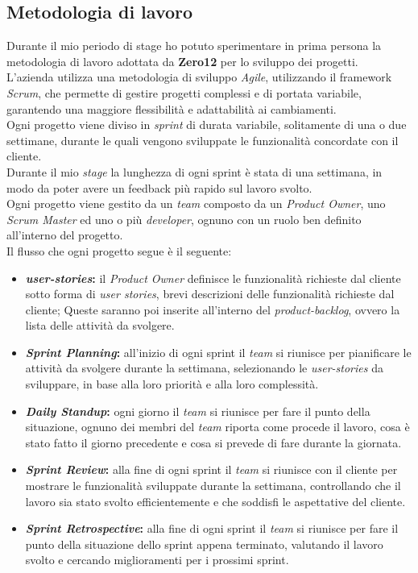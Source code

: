 \subsection{Metodologia di lavoro}
\label{sez:metodologia-lavoro}

Durante il mio periodo di stage ho potuto sperimentare in prima persona la metodologia di lavoro adottata da \textbf{Zero12} per lo sviluppo dei progetti.\\
L'azienda utilizza una metodologia di sviluppo \textit{Agile}, utilizzando il framework \textit{Scrum}, che permette di gestire progetti complessi e di portata variabile,
garantendo una maggiore flessibilità e adattabilità ai cambiamenti.\\
Ogni progetto viene diviso in \textit{sprint} di durata variabile, solitamente di una o due settimane, durante le quali vengono sviluppate le funzionalità concordate con il cliente.\\
Durante il mio \textit{stage} la lunghezza di ogni sprint è stata di una settimana, in modo da poter avere un feedback più rapido sul lavoro svolto.\\
Ogni progetto viene gestito da un \textit{team} composto da un \textit{Product Owner}, uno \textit{Scrum Master} ed uno o più \textit{developer}, ognuno con un ruolo ben definito all'interno del progetto.\\

Il flusso che ogni progetto segue è il seguente:
\begin{itemize}
    \item \textbf{\textit{\gls{user-stories}}:} il \textit{Product Owner} definisce le funzionalità richieste dal cliente sotto forma di \textit{user stories}, brevi descrizioni delle funzionalità richieste dal cliente;
    Queste saranno poi inserite all'interno del \textit{\gls{product-backlog}}, ovvero la lista delle attività da svolgere.
    \item \textbf{\textit{Sprint Planning}:} all'inizio di ogni sprint il \textit{team} si riunisce per pianificare le attività da svolgere durante la settimana, selezionando le \textit{\gls{user-stories}} da sviluppare, 
    in base alla loro priorità e alla loro complessità.
    \item \textbf{\textit{Daily Standup}:} ogni giorno il \textit{team} si riunisce per fare il punto della situazione, ognuno dei membri del \textit{team} riporta come procede il lavoro,
    cosa è stato fatto il giorno precedente e cosa si prevede di fare durante la giornata.
    \item \textbf{\textit{Sprint Review}:} alla fine di ogni sprint il \textit{team} si riunisce con il cliente per mostrare le funzionalità sviluppate durante la settimana, controllando che il lavoro sia stato svolto efficientemente e 
    che soddisfi le aspettative del cliente.
    \item \textbf{\textit{Sprint Retrospective}:} alla fine di ogni sprint il \textit{team} si riunisce per fare il punto della situazione dello sprint appena terminato, valutando il lavoro svolto e cercando miglioramenti per i prossimi sprint.
\end{itemize}